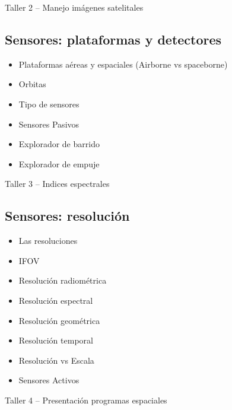 \documentclass[a4paper,twoside,11pt,]{article}
\begin{document}
\begin{tcolorbox}[enhanced,width=5in,center upper,  fontupper=\large\bfseries,drop shadow southwest,sharp corners]
Taller 2 -- Manejo imágenes satelitales
\end{tcolorbox}

\subsection {Sensores: plataformas y detectores}
\begin{itemize}
\item Plataformas aéreas y espaciales (Airborne vs spaceborne)
\item Orbitas
\item Tipo de sensores
\item Sensores Pasivos
\item Explorador de barrido
\item Explorador de empuje
\end{itemize}

\begin{tcolorbox}[enhanced,width=5in,center upper,  fontupper=\large\bfseries,drop shadow southwest,sharp corners]
Taller 3 -- Indices espectrales
\end{tcolorbox}

\subsection {Sensores: resolución}
\begin{itemize}
\item Las resoluciones
\item IFOV
\item Resolución radiométrica
\item Resolución espectral
\item Resolución geométrica
\item Resolución temporal
\item Resolución vs Escala
\item Sensores Activos
\end{itemize}

\begin{tcolorbox}[enhanced,width=5in,center upper,  fontupper=\large\bfseries,drop shadow southwest,sharp corners]
Taller 4 -- Presentación programas espaciales
\end{tcolorbox}
\end{document}
